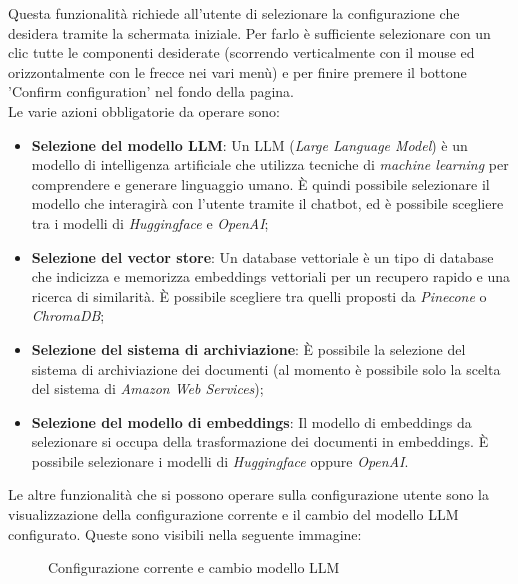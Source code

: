 \documentclass[10pt, a4paper]{article}
\begin{document}
Questa funzionalità richiede all'utente di selezionare la configurazione che desidera tramite la schermata iniziale. Per farlo è sufficiente selezionare con un clic tutte le componenti desiderate (scorrendo verticalmente con il mouse ed orizzontalmente con le frecce nei vari menù) e per finire premere il bottone 'Confirm configuration' nel fondo della pagina.\\ Le varie azioni obbligatorie da operare sono: 
\begin{itemize}
    \item \textbf{Selezione del modello LLM}: Un LLM (\textit{Large Language Model}) è un modello di intelligenza artificiale che utilizza tecniche di \textit{machine learning} per comprendere e generare linguaggio umano. È quindi possibile selezionare il modello che interagirà con l'utente tramite il chatbot, ed è possibile scegliere tra i modelli di \textit{Huggingface} e \textit{OpenAI};
    \item \textbf{Selezione del vector store}: Un database vettoriale è un tipo di database che indicizza e memorizza embeddings vettoriali per un recupero rapido e una ricerca di similarità. È possibile scegliere tra quelli proposti da \textit{Pinecone} o \textit{ChromaDB};
    \item \textbf{Selezione del sistema di archiviazione}: È possibile la selezione del sistema di archiviazione dei documenti (al momento è possibile solo la scelta del sistema di \textit{Amazon Web Services});
    \item \textbf{Selezione del modello di embeddings}: Il modello di embeddings da selezionare si occupa della trasformazione dei documenti in embeddings. È possibile selezionare i modelli di \textit{Huggingface} oppure \textit{OpenAI}.
\end{itemize}

Le altre funzionalità che si possono operare sulla configurazione utente sono la visualizzazione della configurazione corrente e il cambio del modello LLM configurato.
Queste sono visibili nella seguente immagine:


\begin{figure}[H]
    \centering  
    \caption{Configurazione corrente e cambio modello LLM}
    \label{img:settings1}
\end{figure}
\end{document}
